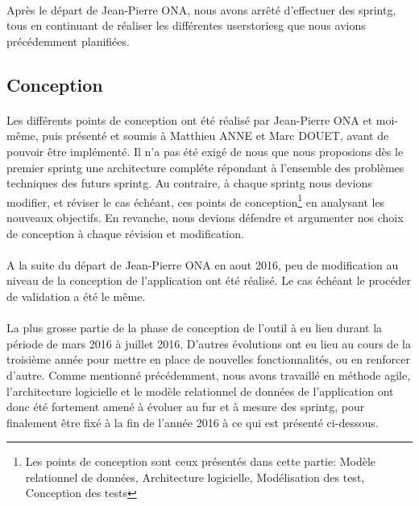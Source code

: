 \documentclass[12pt,a4paper]{report}
\begin{document}
\paragraph*{}Après le départ de Jean-Pierre ONA, nous avons arrêté d'effectuer des \gls{sprintg}, tous en continuant de réaliser les différentes \gls{userstoriesg} que nous avions précédemment planifiées. \\

\subsection{Conception} 
\paragraph*{}Les différents points de conception ont été réalisé par Jean-Pierre ONA et moi-même, puis présenté et soumis à Matthieu ANNE et Marc DOUET, avant de pouvoir être implémenté. Il n'a pas été exigé de nous que nous proposions dès le premier \gls{sprintg} une architecture compléte répondant à l'ensemble des problèmes techniques des futurs \gls{sprintg}. Au contraire, à chaque \gls{sprintg} nous devions  modifier, et réviser le cas échéant, ces points de conception\footnote{Les points de conception sont ceux présentés dans cette partie: Modèle relationnel de données, Architecture logicielle, Modélisation des test, Conception des tests} en analysant les nouveaux objectifs. En revanche, nous devions défendre et argumenter nos choix de conception à chaque révision et modification.
\paragraph*{}A la suite du départ de Jean-Pierre ONA en aout 2016, peu de modification au niveau de la conception de l'application ont été réalisé. Le cas échéant le procéder de validation a été le même.
\paragraph*{}La plus grosse partie de la phase de conception de l'outil à eu lieu durant la période de mars 2016 à juillet 2016. D'autres évolutions ont eu lieu au cours de la troisième année pour mettre en place de nouvelles fonctionnalités, ou en renforcer d'autre. Comme mentionné précédemment, nous avons travaillé en méthode agile, l'architecture logicielle et le modèle relationnel de données de l'application ont donc été fortement amené à évoluer au fur et à mesure des \gls{sprintg}, pour finalement être fixé à la fin de l'année 2016 à ce qui est présenté ci-dessous. \\
\end{document}
